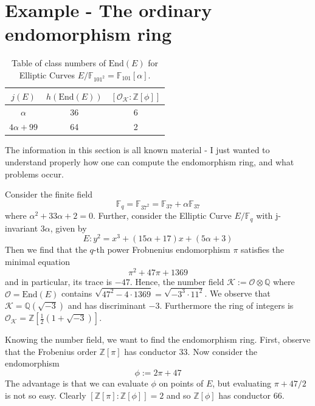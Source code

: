 \documentclass{scrartcl}
\newcommand{\Z}{\mathbb{Z}}
\newcommand{\F}{\mathbb{F}}
\newcommand{\End}{\mathrm{End}}
\newcommand{\K}{\mathcal{K}}
\renewcommand{\O}{\mathcal{O}}
\theoremstyle{definition}
\begin{document}
\section{Example - The ordinary endomorphism ring}
\begin{table}
    \begin{center}
        \begin{tabular}{c c c}
            $j(E)$ & $h(\End(E))$ & $[\O_\K : \Z[\phi]]$ \\
            \hline
            $\alpha$ & 36 & 6 \\
            $4\alpha + 99$ & 64 & 2
        \end{tabular}
    \end{center}
    \caption{\label{tab:class_numbers_of_endo_rings} Table of class numbers of $\End(E)$ for Elliptic Curves $E/\F_{101^2} = \F_{101}[\alpha]$.}
\end{table}
The information in this section is all known material - I just wanted to understand properly how one can compute the endomorphism ring, and what problems occur.

Consider the finite field
\begin{equation*}
    \F_q = \F_{37^2} = \F_{37} + \alpha \F_{37}
\end{equation*}
where $\alpha^2 + 33\alpha + 2 = 0$.
Further, consider the Elliptic Curve $E/\F_q$ with j-invariant $3\alpha$, given by
\begin{equation*}
    E: y^2 = x^3 + (15\alpha + 17)x + (5\alpha + 3)
\end{equation*}
Then we find that the $q$-th power Frobnenius endomorphism $\pi$ satisfies the minimal equation
\begin{equation*}
    \pi^2 + 47 \pi + 1369
\end{equation*}
and in particular, its trace is $-47$.
Hence, the number field $\K := \O \otimes \mathbb{Q}$ where $\O = \End(E)$ contains $\sqrt{47^2 - 4 \cdot 1369} = \sqrt{-3^3 \cdot 11^2}$.
We observe that $\K = \mathbb{Q}(\sqrt{-3})$ and has discriminant $-3$.
Furthermore the ring of integers is $\O_\K = \Z[\frac 1 2(1 + \sqrt{-3})]$.

Knowing the number field, we want to find the endomorphism ring.
First, observe that the Frobenius order $\Z[\pi]$ has conductor 33.
Now consider the endomorphism
\begin{equation*}
    \phi := 2\pi + 47
\end{equation*}
The advantage is that we can evaluate $\phi$ on points of $E$, but evaluating $\pi + 47/2$ is not so easy.
Clearly $[\Z[\pi] : \Z[\phi]] = 2$ and so $\Z[\phi]$ has conductor 66.
\end{document}
